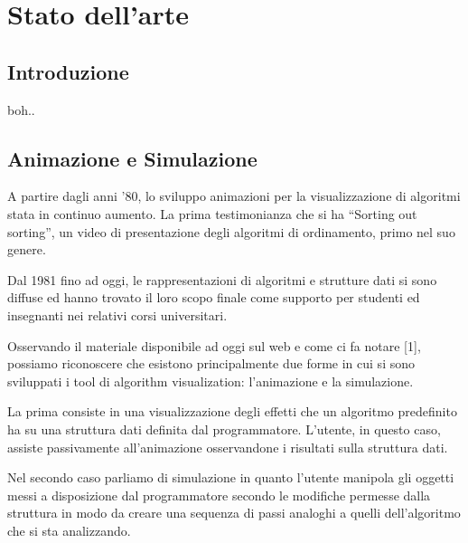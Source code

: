 \chapter{Stato dell'arte}


\section{Introduzione}

boh..


\section{Animazione e Simulazione}

A partire dagli anni '80, lo sviluppo animazioni per la visualizzazione
di algoritmi  stata in continuo aumento. La prima testimonianza che
si ha  {}``Sorting out sorting'', un video di presentazione degli
algoritmi di ordinamento, primo nel suo genere.

Dal 1981 fino ad oggi, le rappresentazioni di algoritmi e strutture
dati si sono diffuse ed hanno trovato il loro scopo finale come supporto
per studenti ed insegnanti nei relativi corsi universitari.

Osservando il materiale disponibile ad oggi sul web e come ci fa notare
{[}1{]}, possiamo riconoscere che esistono principalmente due forme
in cui si sono sviluppati i tool di algorithm visualization: l'animazione
e la simulazione.

La prima consiste in una visualizzazione degli effetti che un algoritmo
predefinito ha su una struttura dati definita dal programmatore. L'utente,
in questo caso, assiste passivamente all'animazione osservandone i
risultati sulla struttura dati.

Nel secondo caso parliamo di simulazione in quanto l'utente manipola
gli oggetti messi a disposizione dal programmatore secondo le modifiche
permesse dalla struttura in modo da creare una sequenza di passi analoghi
a quelli dell'algoritmo che si sta analizzando.

